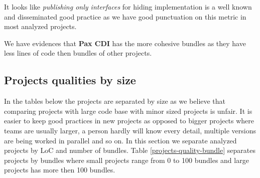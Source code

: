 It looks like \emph{publishing only interfaces} for hiding implementation is a well known and disseminated good practice as we have good punctuation on this metric in most analyzed projects.  

We have evidences that \textbf{Pax CDI} has the more cohesive bundles as they have less lines of code then bundles of other projects.
 
\subsection{Projects qualities by size}

In the tables below the projects are separated by size as we believe that comparing projects with large code base with minor sized projects is unfair. It is easier to keep good practices in new projects as opposed to bigger projects where teams are usually larger, a person hardly will know every detail, multiple versions are being worked in parallel and so on.  In this section we separate analyzed projects by LoC and number of bundles. Table \ref{projects-quality-bundle} separates projects by bundles where small projects range from 0 to 100 bundles and large projects has more then 100 bundles.


